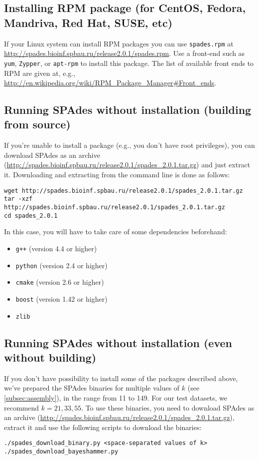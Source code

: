 \documentclass{article}
\def\spades{SPAdes}
\begin{document}
\subsection{Installing RPM package (for CentOS, Fedora, Mandriva, Red Hat, SUSE, etc)}\label{subsec:rpm_package}
If your Linux system can install RPM packages you can use {\tt spades.rpm}
at \url{http://spades.bioinf.spbau.ru/release2.0.1/spades.rpm}. Use a front-end
such as {\tt yum}, {\tt Zypper}, or {\tt apt-rpm} to install this package.
The list of available front ends to RPM are given at, e.g.,
\url{http://en.wikipedia.org/wiki/RPM_Package_Manager#Front_ends}.

\subsection{Running {\spades} without installation (building from source)}\label{subsec:archive}
If you're unable to install a package (e.g., you don't have root privileges),
you can download {\spades} as an archive (\url{http://spades.bioinf.spbau.ru/release2.0.1/spades_2.0.1.tar.gz}) and just extract it.
Downloading and extracting from the command line is done as follows:
\begin{lstlisting}
wget http://spades.bioinf.spbau.ru/release2.0.1/spades_2.0.1.tar.gz
tar -xzf http://spades.bioinf.spbau.ru/release2.0.1/spades_2.0.1.tar.gz
cd spades_2.0.1
\end{lstlisting}
In this case, you will have to take care of some dependencies beforehand:
\begin{itemize}
\item {\tt g++} (version 4.4 or higher)
\item {\tt python} (version 2.4 or higher)
\item {\tt cmake} (version 2.6 or higher)
\item {\tt boost} (version 1.42 or higher)
\item {\tt zlib}
\end{itemize}

\subsection{Running {\spades} without installation (even without building)}\label{subsec:binaries}

If you don't have possibility to install some of the packages described above,
we've prepared the {\spades} binaries for multiple values of $k$ (see 
\cref{subsec:assembly}),
in the range from 11 to 149. For our test datasets, we recommend $k = 21, 33, 55$.
To use these binaries, you need to download {\spades} as an archive (\url{http://spades.bioinf.spbau.ru/release2.0.1/spades_2.0.1.tar.gz}),
extract it and use the following scripts to download the binaries:
\begin{lstlisting}
./spades_download_binary.py <space-separated values of k>
./spades_download_bayeshammer.py
\end{lstlisting}
\end{document}
